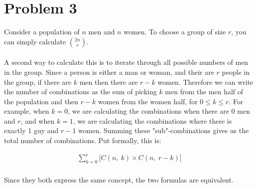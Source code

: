 \documentclass[11pt]{article}
\begin{document}
\section*{Problem 3}
	Consider a population of $n$ men and $n$ women. To choose a group of size $r$, you can simply calculate $\binom{2n}{r}$. 
	\\\\
	A second way to calculate this is to iterate through all possible numbers of men in the group. Since a person is either a man or 
	woman, and their are $r$ people in the group, if there are $k$ men then there are $r-k$ women. Therefore we can write the number of 
	combinations as the sum of picking $k$ men from the men half of the population and then $r-k$ women from the women half, for $0 \le k \le r$. For 
	example, when $k= 0$, we are calculating the combinations when there are 0 men and $r$, and when $k=1$, we are calculating the combinations where 
	there is exactly 1 guy and $r-1$ women. Summing these "sub"-combinations gives us the total number of combinations. Put formally, this is:
	
	\begin{align*}
	\sum\limits_{k=0}^r \lbrack C(n,\ k) \times C(n,\ r-k) \rbrack
	\end{align*}\\
	Since they both express the same concept, the two formulas are equivalent.
\end{document}
